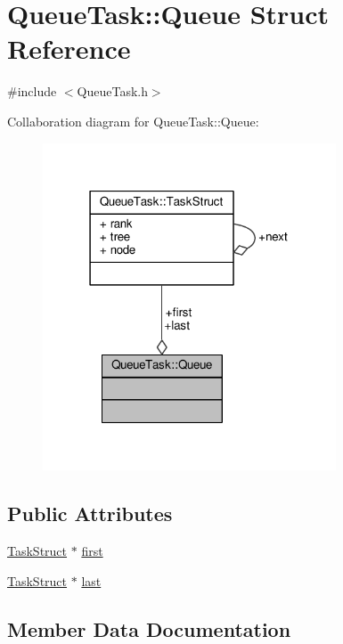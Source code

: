 \hypertarget{structQueueTask_1_1Queue}{}\section{Queue\+Task\+:\+:Queue Struct Reference}
\label{structQueueTask_1_1Queue}


{\ttfamily \#include $<$Queue\+Task.\+h$>$}



Collaboration diagram for Queue\+Task\+:\+:Queue\+:
\nopagebreak
\begin{figure}[H]
\begin{center}
\leavevmode
\includegraphics[width=247pt]{structQueueTask_1_1Queue__coll__graph}
\end{center}
\end{figure}
\subsection*{Public Attributes}
\begin{DoxyCompactItemize}
\item 
\hyperlink{structQueueTask_1_1TaskStruct}{Task\+Struct} $\ast$ \hyperlink{structQueueTask_1_1Queue_aefe07ecf93c1276d1436e57656799a41}{first}
\item 
\hyperlink{structQueueTask_1_1TaskStruct}{Task\+Struct} $\ast$ \hyperlink{structQueueTask_1_1Queue_a886474ef2f7fab2904fb36edf4802350}{last}
\end{DoxyCompactItemize}


\subsection{Member Data Documentation}
